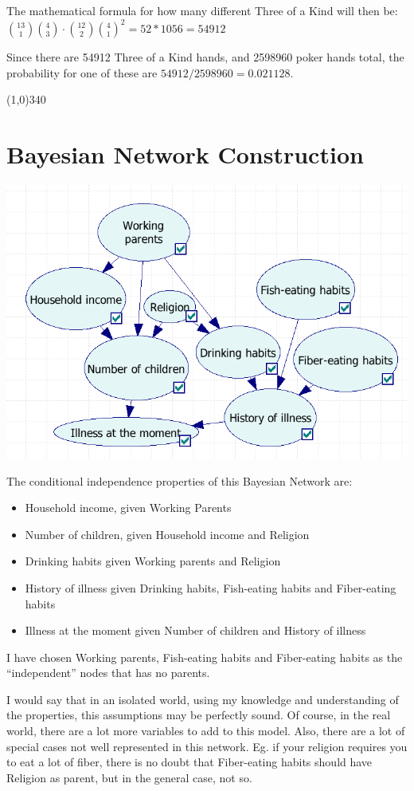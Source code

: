 \documentclass[english]{article}
\begin{document}
The mathematical formula for how many different Three of a Kind will then be:
	\({{13}\choose{1}}{{4}\choose{3}} \cdot {{12}\choose{2}}{{4}\choose{1}}^2 =
	52 * 1056 = 54912\)

Since there are 54912 Three of a Kind hands, and 2598960 poker hands total, the
probability for one of these are \(54912 / 2598960 = 0.021128\).

\line(1,0){340}
\section{Bayesian Network Construction}
\centerline{\includegraphics[width=1.4\textwidth]{bay-net-const.png}}
The conditional independence properties of this Bayesian Network are:
\begin{itemize}
  \item Household income, given Working Parents
  \item Number of children, given Household income and Religion
  \item Drinking habits given Working parents and Religion
  \item History of illness given Drinking habits, Fish-eating habits and
  Fiber-eating habits
  \item Illness at the moment given Number of children and History of illness
\end{itemize}
I have chosen Working parents, Fish-eating habits and Fiber-eating habits as the
``independent'' nodes that has no parents.

I would say that in an isolated world, using my knowledge and understanding of
the properties, this assumptions may be perfectly sound. Of course, in the
real world, there are a lot more variables to add to this model. Also, there are
a lot of special cases not well represented in this network.
Eg. if your religion requires you to eat a lot of fiber, there is no doubt that
Fiber-eating habits should have Religion as parent, but in the general case, not
so.
\end{document}
